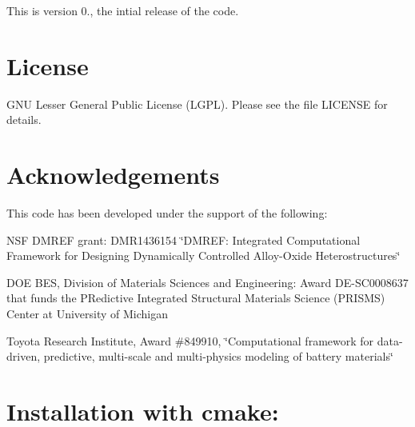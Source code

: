 This is version 0., the intial release of the code.

\section*{{\bfseries License}~\newline
 }

G\+NU Lesser General Public License (L\+G\+PL). Please see the file L\+I\+C\+E\+N\+SE for details.

\section*{{\bfseries Acknowledgements}~\newline
 }

This code has been developed under the support of the following\+: ~\newline



\begin{DoxyItemize}
\item N\+SF D\+M\+R\+EF grant\+: D\+M\+R1436154 \char`\"{}\+D\+M\+R\+E\+F\+: Integrated Computational Framework for Designing Dynamically Controlled Alloy-\/\+Oxide Heterostructures\char`\"{} ~\newline

\item D\+OE B\+ES, Division of Materials Sciences and Engineering\+: Award DE-\/\+S\+C0008637 that funds the P\+Redictive Integrated Structural Materials Science (P\+R\+I\+S\+MS) Center at University of Michigan ~\newline

\item Toyota Research Institute, Award \#849910, \char`\"{}\+Computational framework for data-\/driven, predictive, multi-\/scale and multi-\/physics modeling of battery materials\char`\"{} ~\newline

\end{DoxyItemize}

\section*{{\bfseries Installation with cmake\+:}~\newline
 }


